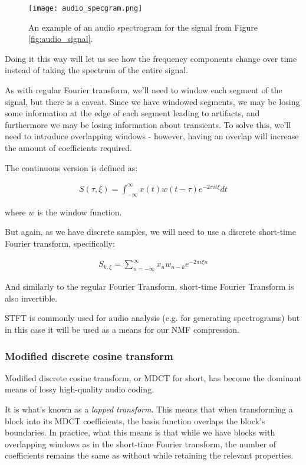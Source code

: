 \begin{figure}[ht]
	\caption[Example audio spectrogram]{An example of an audio spectrogram for the signal from Figure \ref{fig:audio_signal}.}
	\centering
	\texttt{[image: audio\_specgram.png]}
\end{figure}

Doing it this way will let us see how the frequency components change over time instead of taking the spectrum of the entire signal.

As with regular Fourier transform, we'll need to window each segment of the signal, but there is a caveat. Since we have windowed segments, we may be losing some information at the edge of each segment leading to artifacts, and furthermore we may be losing information about transients. To solve this, we'll need to introduce overlapping windows - however, having an overlap will increase the amount of coefficients required.

The continuous version is defined as: \cite{Recoskie2014ConstrainedNM}

\begin{align}
S(\tau, \xi) = \int_{-\infty}^{\infty}x(t)w(t-\tau)e^{-2\pi it\xi}dt
\end{align}

where $w$ is the window function.

But again, as we have discrete samples, we will need to use a discrete short-time Fourier transform, specifically:

\begin{align}
S_{k, \xi} = \sum_{n=-\infty}^{\infty}x_nw_{n-k}e^{-2\pi i\xi n}
\end{align}

And similarly to the regular Fourier Transform, short-time Fourier Transform is also invertible. \cite{selesnick_2009}

STFT is commonly used for audio analysis (e.g. for generating spectrograms) but in this case it will be used as a means for our NMF compression.

\subsubsection{Modified discrete cosine transform}
Modified discrete cosine transform, or MDCT for short, has become the dominant means of lossy high-quality audio coding. \cite{wang_vilermo_2012_mdct}

It is what's known as a \emph{lapped transform}. This means that when transforming a block into its MDCT coefficients, the basis function overlaps the block's boundaries. \cite{Malvar:1992:SPL:531523} In practice, what this means is that while we have blocks with overlapping windows as in the short-time Fourier transform, the number of coefficients remains the same as without while retaining the relevant properties.

